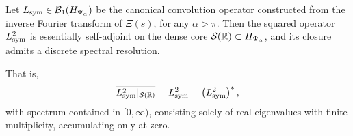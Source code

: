 \begin{lemma}
\label{lem:Lsym_square_selfadjoint}
Let \( L_{\mathrm{sym}} \in \mathcal{B}_1(H_{\Psi_\alpha}) \) be the canonical convolution operator constructed from the inverse Fourier transform of \( \Xi(s) \), for any \( \alpha > \pi \). Then the squared operator \( L_{\mathrm{sym}}^2 \) is essentially self-adjoint on the dense core \( \mathcal{S}(\mathbb{R}) \subset H_{\Psi_\alpha} \), and its closure admits a discrete spectral resolution.

That is,
\[
\overline{L_{\mathrm{sym}}^2|_{\mathcal{S}(\mathbb{R})}} = L_{\mathrm{sym}}^2 = \left( L_{\mathrm{sym}}^2 \right)^*,
\]
with spectrum contained in \( [0, \infty) \), consisting solely of real eigenvalues with finite multiplicity, accumulating only at zero.
\end{lemma}
